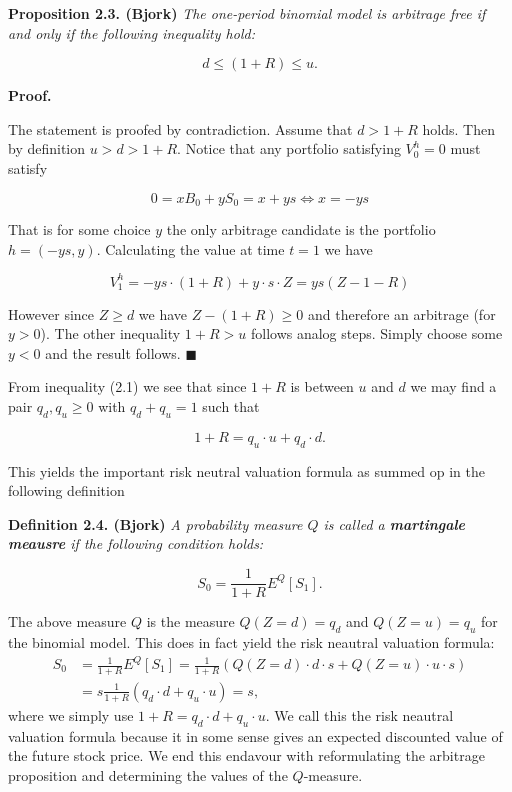 \documentclass[
]{book}
\begin{document}
\textbf{Proposition 2.3. (Bjork)} \emph{The one-period binomial model is arbitrage free if and only if the following inequality hold:}

\[d\le (1+R)\le u.\tag{2.1}\]

\noindent\makebox[\linewidth]{\rule{\textwidth}{0.4pt}}

\textbf{Proof.}

The statement is proofed by contradiction. Assume that \(d>1+R\) holds. Then by definition \(u>d>1+R\). Notice that any portfolio satisfying \(V_0^h=0\) must satisfy

\[0=xB_0+yS_0=x+ys\iff x=-ys\]

That is for some choice \(y\) the only arbitrage candidate is the portfolio \(h=(-ys,y)\). Calculating the value at time \(t=1\) we have

\[V_1^h=-ys\cdot(1+R)+y\cdot s\cdot Z=ys(Z-1-R)\]

However since \(Z\ge d\) we have \(Z-(1+R)\ge 0\) and therefore an arbitrage (for \(y>0\)). The other inequality \(1+R>u\) follows analog steps. Simply choose some \(y<0\) and the result follows. \(\blacksquare\)

\noindent\makebox[\linewidth]{\rule{\textwidth}{0.4pt}}
From inequality (2.1) we see that since \(1+R\) is between \(u\) and \(d\) we may find a pair \(q_d,q_u\ge 0\) with \(q_d+q_u=1\) such that

\[1+R=q_u\cdot u+q_d\cdot d.\]

This yields the important risk neutral valuation formula as summed op in the following definition

\textbf{Definition 2.4. (Bjork)} \emph{A probability measure \(Q\) is called a \textbf{martingale meausre} if the following condition holds:}

\[S_0=\frac{1}{1+R}E^Q[S_1].\]

The above measure \(Q\) is the measure \(Q(Z=d)=q_d\) and \(Q(Z=u)=q_u\) for the binomial model. This does in fact yield the risk neautral valuation formula:
\begin{align*}
S_0&=\frac{1}{1+R}E^Q[S_1]=\frac{1}{1+R}(Q(Z=d)\cdot d\cdot s+Q(Z=u)\cdot u\cdot s)\\
&=s\frac{1}{1+R}(q_d\cdot d+q_u\cdot u)=s,
\end{align*}
where we simply use \(1+R=q_d\cdot d+q_u\cdot u\). We call this the risk neautral valuation formula because it in some sense gives an expected discounted value of the future stock price. We end this endavour with reformulating the arbitrage proposition and determining the values of the \(Q\)-measure.
\end{document}
